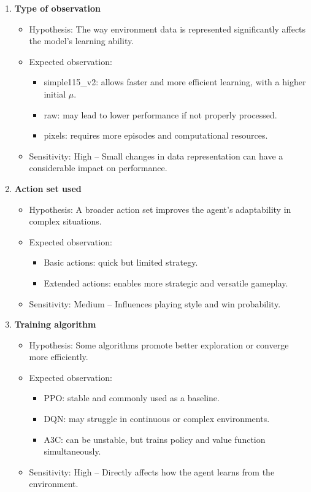 \begin{enumerate}
    \item \textbf{Type of observation}
    \begin{itemize}
        \item Hypothesis: The way environment data is represented significantly affects the model's learning ability.
        \item Expected observation:
        \begin{itemize}
            \item simple115\_v2: allows faster and more efficient learning, with a higher initial $\mu$.
            \item raw: may lead to lower performance if not properly processed.
            \item pixels: requires more episodes and computational resources.
        \end{itemize}
        \item Sensitivity: High – Small changes in data representation can have a considerable impact on performance.
    \end{itemize}

    \item \textbf{Action set used}
    \begin{itemize}
        \item Hypothesis: A broader action set improves the agent’s adaptability in complex situations.
        \item Expected observation:
        \begin{itemize}
            \item Basic actions: quick but limited strategy.
            \item Extended actions: enables more strategic and versatile gameplay.
        \end{itemize}
        \item Sensitivity: Medium – Influences playing style and win probability.
    \end{itemize}

    \item \textbf{Training algorithm}
    \begin{itemize}
        \item Hypothesis: Some algorithms promote better exploration or converge more efficiently.
        \item Expected observation:
        \begin{itemize}
            \item PPO: stable and commonly used as a baseline.
            \item DQN: may struggle in continuous or complex environments.
            \item A3C: can be unstable, but trains policy and value function simultaneously.
        \end{itemize}
        \item Sensitivity: High – Directly affects how the agent learns from the environment.
    \end{itemize}


\end{enumerate}
